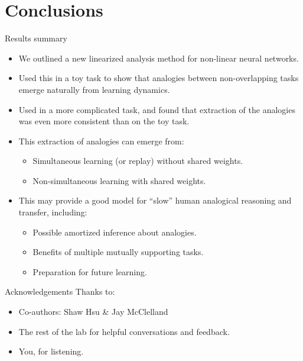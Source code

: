 \documentclass{beamer}
\begin{document}
\section{Conclusions}

\begin{frame}{Results summary}
\begin{itemize}
    \item<1-> We outlined a new linearized analysis method for non-linear neural networks. 
    \item<2-> Used this in a toy task to show that analogies between non-overlapping tasks emerge naturally from learning dynamics. 
    \item<3-> Used in a more complicated task, and found that extraction of the analogies was even more consistent than on the toy task. 
    \item<4-> This extraction of analogies can emerge from:
    \begin{itemize}
	\item<5-> Simultaneous learning (or replay) without shared weights. 
	\item<6-> Non-simultaneous learning with shared weights.
    \end{itemize}
    \item<7-> This may provide a good model for ``slow'' human analogical reasoning and transfer, including:
    \begin{itemize}
	\item<8-> Possible amortized inference about analogies.
	\item<9-> Benefits of multiple mutually supporting tasks.
	\item<10-> Preparation for future learning.
    \end{itemize}
\end{itemize}
\end{frame}

\begin{frame}{Acknowledgements}
Thanks to:
\begin{itemize}
    \item Co-authors: Shaw Hsu \& Jay McClelland
    \item The rest of the lab for helpful conversations and feedback. 
    \item You, for listening.
\end{itemize}
\end{frame}

\begin{frame}[allowframebreaks]


\end{frame}
\end{document}
